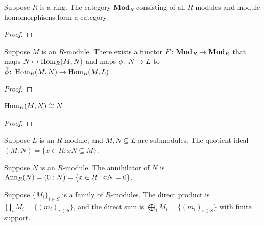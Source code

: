 \begin{proposition}
    Suppose \(R\) is a ring.
    The category \(\textbf{Mod}_R\) consisting of all \(R\)-modules
    and module homomorphisms form a category.
\end{proposition}
\begin{proof}
    
\end{proof}

\begin{proposition}
    Suppose \(M\) is an \(R\)-module.
    There exists a functor \(F\colon\textbf{Mod}_R\to\textbf{Mod}_R\)
    that maps \(N \mapsto \operatorname{Hom}_R(M,N)\)
    and maps \(\phi\colon N\to L\) to \(\tilde{\phi}\colon\operatorname{Hom}_R(M,N)\to\operatorname{Hom}_R(M,L)\).
\end{proposition}
\begin{proof}
    
\end{proof}
\begin{corollary}
    \(\operatorname{Hom}_R(M,N) \cong N\).
\end{corollary}
\begin{proof}
    
\end{proof}

\begin{definition}
    Suppose \(L\) is an \(R\)-module,
    and \(M,N \subseteq L\) are submodules.
    The quotient ideal \((M:N) = \{x \in R : xN \subseteq M\}\).
\end{definition}
\begin{definition}
    Suppose \(N\) is an \(R\)-module.
    The annihilator of \(N\) is \(\operatorname{Ann}_R(N) = (0:N) = \{x \in R : xN = 0\}\).
\end{definition}

\begin{definition}
    Suppose \({\{M_i\}}_{i \in S}\) is a family of \(R\)-modules.
    The direct product is \(\prod_i M_i = \{{(m_i)}_{i \in S}\}\),
    and the direct sum is \(\bigoplus_i M_i = \{{(m_i)_{i \in S}}\}\) with finite support.
\end{definition}

